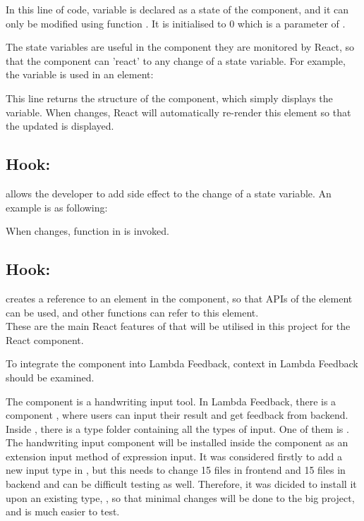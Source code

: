 \documentclass[12pt,twoside]{report}
\begin{document}
In this line of code, variable  is declared as a state of the component, and it can only be modified using function . It is initialised to 0 which is a parameter of .

The state variables are useful in the component they are monitored by React, so that the component can 'react' to any change of a state variable. For example, the  variable is used in an element:

\centerline{}

This line returns the structure of the component, which simply displays the  variable. When  changes, React will automatically re-render this element so that the updated  is displayed.

\subsection*{Hook: }
\label{subsec:useEffect}
 allows the developer to add side effect to the change of a state variable. An example is as following:

\centerline{}

When  changes, function in  is invoked.

\subsection*{Hook: }
\label{subsec:useRef}
 creates a reference to an element in the component, so that APIs of the element can be used, and other functions can refer to this element.
\\

These are the main React features of that will be utilised in this project for the React component. 

To integrate the component into Lambda Feedback, context in Lambda Feedback should be examined.

The component is a handwriting input tool. In Lambda Feedback, there is a
component , where users can input their result and get
feedback from backend. Inside , there is a type folder
containing all the types of input. One of them is . The
handwriting input component will be installed inside the 
component as an extension input method of expression input. It was considered
firstly to add a new input type in , but this needs to change 15 files in frontend and 15 files in backend and can be difficult testing as well. Therefore, it was dicided to install it upon an existing type, , so that minimal changes will be done to the big project, and is much easier to test.
\end{document}
